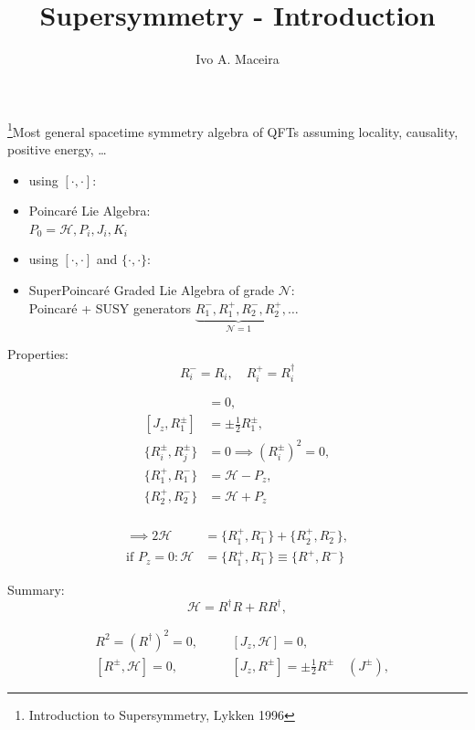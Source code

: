 \documentclass[a4paper]{article}
\title{Supersymmetry - Introduction}
\author{Ivo A. Maceira}
\newcommand{\N}[0]{\mathcal{N}}
\newcommand{\Ha}[0]{\mathcal{H}}
\newcommand{\com}[2]{[#1,#2]}
\newcommand{\acom}[2]{\{#1,#2\}}
\newcommand{\da}[0]{^{\dagger}}
\begin{document}
\maketitle
\footnote{Introduction to Supersymmetry, Lykken 1996}Most general spacetime symmetry algebra of QFTs assuming locality, causality, positive energy, \dots
\begin{itemize}
	\item using
		$
		\com{\cdot}{\cdot}:
		$

	\item[] Poincaré Lie Algebra:\\
	$P_0 = \Ha, P_i, J_i, K_i$

	\item using
		$
		\com{\cdot}{\cdot}
		$
		and
		$
		\acom{\cdot}{\cdot}:
		$

	\item[] SuperPoincaré Graded Lie Algebra of grade $\N$:\\
		Poincaré + SUSY generators
		$
		\underbrace{R_1^-,R_1^+,R_2^-,R_2^+}_{\N = 1},\dots
		$

\end{itemize}

Properties:
\begin{equation}
	R_i^- = R_i,\quad R_i^+ = R_i\da
\end{equation}

\begin{align}
	\com{P_{\mu}}{R^{\pm}_i} &= 0,\\
	\com{J_z}{R_1^{\pm}} &= \pm\frac{1}{2} R_1^{\pm},\\
	\acom{R_i^{\pm}}{R_j^{\pm}} &= 0 \implies (R_i^{\pm})^2 = 0, \\
	\acom{R_1^+}{R_1^-} &= \Ha - P_z, \\
	\acom{R_2^+}{R_2^-} &= \Ha + P_z \\
\end{align}

\begin{align}
	\implies 2\Ha &= \acom{R_1^+}{R_1^-} + \acom{R_2^+}{R_2^-}, \\
	\text{if } P_z = 0: \Ha &= \acom{R_1^+}{R_1^-} \equiv \acom{R^+}{R^-}
\end{align}

Summary:
\begin{equation}
	\Ha = R\da R + R R\da,
\end{equation}

\begin{align}
	&R^2 = (R\da)^2 = 0,&\quad& \com{J_z}{\Ha} = 0, \\
	&\com{R^{\pm}}{\Ha} = 0,&\quad& \com{J_z}{R^{\pm}} = \pm \frac{1}{2} R^{\pm}\quad (J^{\pm}),
\end{align}
\end{document}
